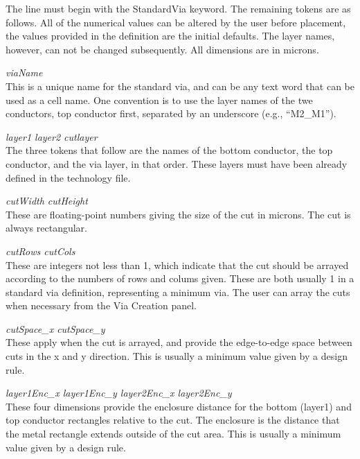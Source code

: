The line must begin with the {\vt StandardVia} keyword.  The remaining
tokens are as follows.  All of the numerical values can be altered by
the user before placement, the values provided in the definition are
the initial defaults.  The layer names, however, can not be changed
subsequently.  All dimensions are in microns.

\begin{description}
\item{\it viaName}\\
This is a unique name for the standard via, and can be any text word
that can be used as a cell name.  One convention is to use the layer
names of the twe conductors, top conductor first, separated by an
underscore (e.g., ``{\vt M2\_M1}'').

\item{\it layer1 layer2 cutlayer}\\
The three tokens that follow are the names of the bottom conductor,
the top conductor, and the via layer, in that order.  These layers
must have been already defined in the technology file.

\item{\it cutWidth cutHeight}\\
These are floating-point numbers giving the size of the cut in
microns.  The cut is always rectangular.

\item{\it cutRows cutCols}\\
These are integers not less than 1, which indicate that the cut should
be arrayed according to the numbers of rows and colums given.  These
are both usually 1 in a standard via definition, representing a
minimum via.  The user can array the cuts when necessary from the {\cb
Via Creation} panel.

\item{\it cutSpace\_x cutSpace\_y}\\
These apply when the cut is arrayed, and provide the edge-to-edge
space between cuts in the x and y direction.  This is usually a
minimum value given by a design rule.

\item{\it layer1Enc\_x layer1Enc\_y layer2Enc\_x layer2Enc\_y}\\
These four dimensions provide the enclosure distance for the bottom
(layer1) and top conductor rectangles relative to the cut.  The
enclosure is the distance that the metal rectangle extends outside of
the cut area.  This is usually a minimum value given by a design rule.


\end{description}
